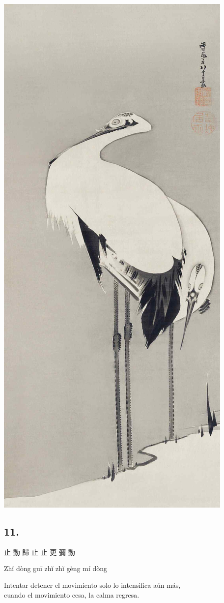 \documentclass[
  a5paperpaper,
]{article}
\begin{document}
\hypertarget{01}{}
\includegraphics{../img/image03.jpg}

\begin{verseblock}

\hypertarget{section-12}{%
\subsection{11.}\label{section-12}}

止 動 歸 止 止 更 彌 動

Zhĭ dòng guī zhĭ zhĭ gèng mí dòng

Intentar detener el movimiento solo lo intensifica aún más,\\
cuando el movimiento cesa, la calma regresa.

\end{verseblock}
\end{document}
